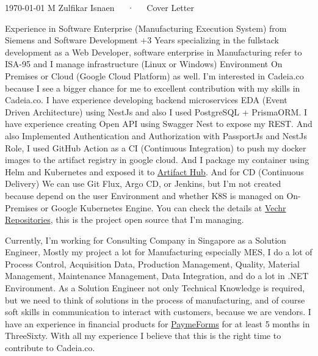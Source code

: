 \documentclass[10pt, a4paper]{awesome-cv}
\begin{document}
\makecvheader[R]

\makecvfooter
  {\today}
  {M Zulfikar Isnaen~~~·~~~Cover Letter}
  {}

\makelettertitle

\begin{cvletter}

Experience in Software Enterprise (Manufacturing Execution System) from Siemens and Software Development +3 Years specializing in the fullstack development as a Web Developer, software enterprise in Manufacturing refer to ISA-95 and I manage infrastructure (Linux or Windows) Environment On Premises or Cloud (Google Cloud Platform) as well.
I'm interested in Cadeia.co because I see a bigger chance for me to excellent contribution with my skills in Cadeia.co. I have experience developing backend microservices EDA (Event Driven Architecture) using NestJs and also I used PostgreSQL + PrismaORM. I have experience creating Open API using Swagger Nest to expose my REST.
And also Implemented Authentication and Authorization with PassportJs and NestJs Role, I used GitHub Action as a CI (Continuous Integration) to push my docker images to the artifact registry in google cloud. And I package my container using Helm and Kubernetes and exposed it to \href{https://artifacthub.io/packages/helm/vechr/vechr-iiot}{Artifact Hub}.
And for CD (Continuous Delivery) We can use Git Flux, Argo CD, or Jenkins, but I'm not created because depend on the user Environment and whether K8S is managed on On-Premises or Google Kubernetes Engine. You can check the details at \href{https://github.com/orgs/vechr/repositories}{Vechr Repositories}, this is the project open source that I'm managing.

Currently, I'm working for Consulting Company in Singapore as a Solution Engineer, Mostly my project a lot for Manufacturing especially MES, I do a lot of Process Control, Acquisition Data, Production Management, Quality, Material Management, Maintenance Management, Data Integration, and do a lot in .NET Environment. As a Solution Engineer not only Technical Knowledge is required, 
but we need to think of solutions in the process of manufacturing, and of course soft skills in communication to interact with customers, because we are vendors. I have an experience in financial products for \href{https://paymeforms.com/}{PaymeForms}  for at least 5 months in ThreeSixty.
With all my experience I believe that this is the right time to contribute to Cadeia.co.


\end{cvletter}
\end{document}
